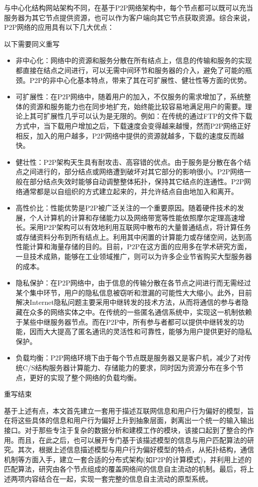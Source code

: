 与中心化结构网站架构不同，在基于P2P网络架构中，每个节点都可以既可以充当服务器为其它节点提供资源，也可以作为客户端向其它节点获取资源。综合来说，P2P网络的应用具有以下几大优点\cite{p2psurvey}：

{\color{red} 以下需要同义重写}
\begin{itemize}
\item 非中心化：网络中的资源和服务分散在所有结点上，信息的传输和服务的实现都直接在结点之间进行，可以无需中间环节和服务器的介入，避免了可能的瓶颈。P2P的非中心化基本特点，带来了其在可扩展性、健壮性等方面的优势。
\item 可扩展性：在P2P网络中，随着用户的加入，不仅服务的需求增加了，系统整体的资源和服务能力也在同步地扩充，始终能比较容易地满足用户的需要。理论上其可扩展性几乎可以认为是无限的。例如：在传统的通过FTP的文件下载方式中，当下载用户增加之后，下载速度会变得越来越慢，然而P2P网络正好相反，加入的用户越多，P2P网络中提供的资源就越多，下载的速度反而越快。
\item 健壮性：P2P架构天生具有耐攻击、高容错的优点。由于服务是分散在各个结点之间进行的，部分结点或网络遭到破坏对其它部分的影响很小。P2P网络一般在部分结点失效时能够自动调整整体拓扑，保持其它结点的连通性。P2P网络通常都是以自组织的方式建立起来的，并允许结点自由地加入和离开。
\item 高性价比：性能优势是P2P被广泛关注的一个重要原因。随着硬件技术的发展，个人计算机的计算和存储能力以及网络带宽等性能依照摩尔定理高速增长。采用P2P架构可以有效地利用互联网中散布的大量普通结点，将计算任务或存储资料分布到所有结点上。利用其中闲置的计算能力或存储空间，达到高性能计算和海量存储的目的。目前，P2P在这方面的应用多在学术研究方面，一旦技术成熟，能够在工业领域推广，则可以为许多企业节省购买大型服务器的成本。
\item 隐私保护：在P2P网络中，由于信息的传输分散在各节点之间进行而无需经过某个集中环节，用户的隐私信息被窃听和泄漏的可能性大大缩小。此外，目前解决Internet隐私问题主要采用中继转发的技术方法，从而将通信的参与者隐藏在众多的网络实体之中。在传统的一些匿名通信系统中，实现这一机制依赖于某些中继服务器节点。而在P2P中，所有参与者都可以提供中继转发的功能，因而大大提高了匿名通讯的灵活性和可靠性，能够为用户提供更好的隐私保护。
\item 负载均衡：P2P网络环境下由于每个节点既是服务器又是客户机，减少了对传统C/S结构服务器计算能力、存储能力的要求，同时因为资源分布在多个节点，更好的实现了整个网络的负载均衡。
\end{itemize}
{\color{red} 重写结束}

基于上述有点，本文首先建立一套用于描述互联网信息和用户行为偏好的模型，旨在将这些具体的信息和用户行为偏好上升到抽象层面，剥离出一个统一的输入输出接口。对于那些专注于复杂的数据分析和建模工作的模块，该接口起到了整合的作用。而且，在此之后，也可以展开专门基于该描述模型的信息与用户匹配算法的研究。其次，根据上述信息描述模型与用户行为偏好模型的特点，从拓扑结构，通信机制等方面入手，建立一套合适的分布式架构(如P2P的计算模式)，并利用上述的匹配算法，研究由各个节点组成的覆盖网络间的信息自主流动的机制。最后，将上述两项内容结合在一起，实现一套完整的信息自主流动的原型系统。

